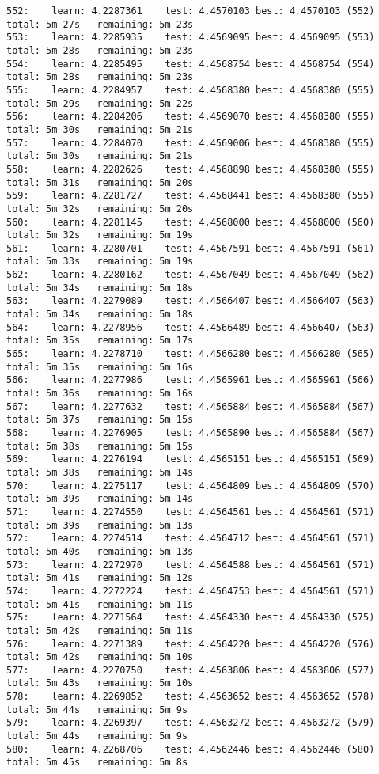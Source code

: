 \documentclass[11pt]{article}
\begin{document}
\begin{Verbatim}[commandchars=\\\{\}]
552:	learn: 4.2287361	test: 4.4570103	best: 4.4570103 (552)	total: 5m 27s	remaining: 5m 23s
553:	learn: 4.2285935	test: 4.4569095	best: 4.4569095 (553)	total: 5m 28s	remaining: 5m 23s
554:	learn: 4.2285495	test: 4.4568754	best: 4.4568754 (554)	total: 5m 28s	remaining: 5m 23s
555:	learn: 4.2284957	test: 4.4568380	best: 4.4568380 (555)	total: 5m 29s	remaining: 5m 22s
556:	learn: 4.2284206	test: 4.4569070	best: 4.4568380 (555)	total: 5m 30s	remaining: 5m 21s
557:	learn: 4.2284070	test: 4.4569006	best: 4.4568380 (555)	total: 5m 30s	remaining: 5m 21s
558:	learn: 4.2282626	test: 4.4568898	best: 4.4568380 (555)	total: 5m 31s	remaining: 5m 20s
559:	learn: 4.2281727	test: 4.4568441	best: 4.4568380 (555)	total: 5m 32s	remaining: 5m 20s
560:	learn: 4.2281145	test: 4.4568000	best: 4.4568000 (560)	total: 5m 32s	remaining: 5m 19s
561:	learn: 4.2280701	test: 4.4567591	best: 4.4567591 (561)	total: 5m 33s	remaining: 5m 19s
562:	learn: 4.2280162	test: 4.4567049	best: 4.4567049 (562)	total: 5m 34s	remaining: 5m 18s
563:	learn: 4.2279089	test: 4.4566407	best: 4.4566407 (563)	total: 5m 34s	remaining: 5m 18s
564:	learn: 4.2278956	test: 4.4566489	best: 4.4566407 (563)	total: 5m 35s	remaining: 5m 17s
565:	learn: 4.2278710	test: 4.4566280	best: 4.4566280 (565)	total: 5m 35s	remaining: 5m 16s
566:	learn: 4.2277986	test: 4.4565961	best: 4.4565961 (566)	total: 5m 36s	remaining: 5m 16s
567:	learn: 4.2277632	test: 4.4565884	best: 4.4565884 (567)	total: 5m 37s	remaining: 5m 15s
568:	learn: 4.2276905	test: 4.4565890	best: 4.4565884 (567)	total: 5m 38s	remaining: 5m 15s
569:	learn: 4.2276194	test: 4.4565151	best: 4.4565151 (569)	total: 5m 38s	remaining: 5m 14s
570:	learn: 4.2275117	test: 4.4564809	best: 4.4564809 (570)	total: 5m 39s	remaining: 5m 14s
571:	learn: 4.2274550	test: 4.4564561	best: 4.4564561 (571)	total: 5m 39s	remaining: 5m 13s
572:	learn: 4.2274514	test: 4.4564712	best: 4.4564561 (571)	total: 5m 40s	remaining: 5m 13s
573:	learn: 4.2272970	test: 4.4564588	best: 4.4564561 (571)	total: 5m 41s	remaining: 5m 12s
574:	learn: 4.2272224	test: 4.4564753	best: 4.4564561 (571)	total: 5m 41s	remaining: 5m 11s
575:	learn: 4.2271564	test: 4.4564330	best: 4.4564330 (575)	total: 5m 42s	remaining: 5m 11s
576:	learn: 4.2271389	test: 4.4564220	best: 4.4564220 (576)	total: 5m 42s	remaining: 5m 10s
577:	learn: 4.2270750	test: 4.4563806	best: 4.4563806 (577)	total: 5m 43s	remaining: 5m 10s
578:	learn: 4.2269852	test: 4.4563652	best: 4.4563652 (578)	total: 5m 44s	remaining: 5m 9s
579:	learn: 4.2269397	test: 4.4563272	best: 4.4563272 (579)	total: 5m 44s	remaining: 5m 9s
580:	learn: 4.2268706	test: 4.4562446	best: 4.4562446 (580)	total: 5m 45s	remaining: 5m 8s

\end{Verbatim}
\end{document}
